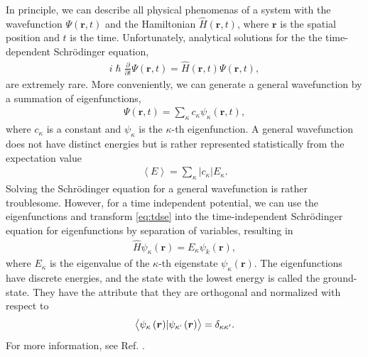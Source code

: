 In principle, we can describe all physical phenomenas of a system with the wavefunction $\Psi(\boldsymbol{r},t)$ and the Hamiltonian $\hat{H}(\boldsymbol{r},t)$, where $\boldsymbol{r}$ is the spatial position and $t$ is the time. Unfortunately, analytical solutions for the the time-dependent Schrödinger equation,
\begin{align}
    i\hslash \frac{\partial}{\partial t} \Psi(\boldsymbol{r},t) = \hat{H}(\boldsymbol{r},t) \Psi(\boldsymbol{r},t),
    \label{eq:tdse}
\end{align}
are extremely rare. More conveniently, we can generate a general wavefunction by a summation of eigenfunctions,
\begin{align}
  \Psi(\boldsymbol{r},t) = \sum_\kappa c_\kappa \psi_\kappa(\boldsymbol{r},t),
\end{align}
where $c_\kappa$ is a constant and $\psi_\kappa$ is the $\kappa$-th eigenfunction. A general wavefunction does not have distinct energies but is rather represented statistically from the expectation value  %
\begin{align}
  \left \langle E \right \rangle = \sum_\kappa \lvert c_\kappa \rvert E_\kappa.
\end{align} Solving the Schrödinger equation for a general wavefunction is rather troublesome. However, for a time independent potential, we can use the eigenfunctions and transform \autoref{eq:tdse} into the time-independent Schrödinger equation for eigenfunctions by separation of variables, resulting in
\begin{align}
  \hat{H}\psi_\kappa(\boldsymbol{r}) = E_\kappa \psi_k(\boldsymbol{r}),
\end{align}
where $E_\kappa$ is the eigenvalue of the $\kappa$-th eigenstate $\psi_\kappa(\boldsymbol{r})$. The eigenfunctions have discrete energies, and the state with the lowest energy is called the ground-state. They have the attribute that they are orthogonal and normalized with respect to
\begin{align}
  \left \langle \psi_\kappa \left(\boldsymbol{r}\right) \rvert \psi_{\kappa`} \left(\boldsymbol{r} \right) \right \rangle = \delta_{\kappa \kappa'}.
\end{align}
For more information, see Ref. \cite{Griffiths2017}.


